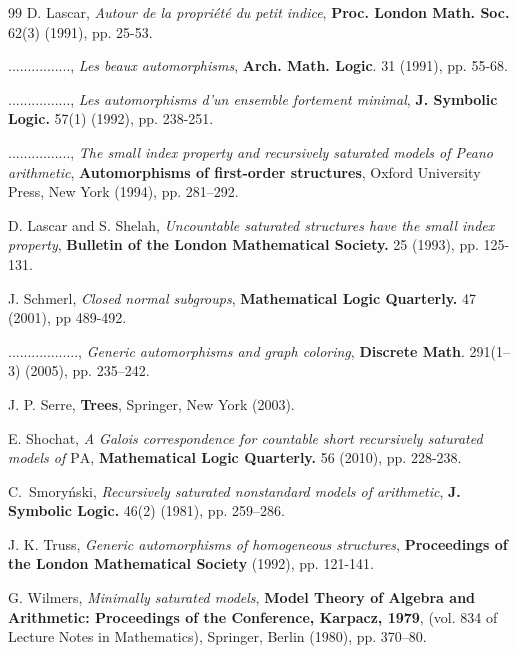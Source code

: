 \documentclass[11pt]{article}
\theoremstyle{plain}
\theoremstyle{definition}
\newcommand{\pa}{\mathrm{PA}}
\begin{document}
\begin{thebibliography}{99}
 D. Lascar, \textit{Autour de la propri\'et\'e du petit indice}, \textbf{Proc. London Math. Soc.} 62(3)  (1991), pp. 25-53.

 ................,  \textit{Les beaux automorphisms}, \textbf{Arch. Math. Logic}. 31 (1991), pp. 55-68.

 ................, \textit{Les automorphisms d'un ensemble fortement minimal}, \textbf{J. Symbolic Logic.} 57(1) (1992), pp. 238-251.

 ................, \textit{The small index property and recursively saturated models of Peano arithmetic}, \textbf{Automorphisms	of first-order structures},  Oxford University Press, New York (1994), pp. 281–292. \cite{km}

 D. Lascar and S.  Shelah,  \textit{Uncountable saturated structures have the small index property}, \textbf{Bulletin of the London Mathematical Society.} 25 (1993), pp. 125-131.

 J. Schmerl, \textit{Closed normal subgroups}, \textbf{Mathematical Logic Quarterly.} 47 (2001), pp 489-492.


  .................., \textit{Generic automorphisms and graph coloring}, \textbf{Discrete Math}. 291(1–3) (2005), pp. 235–242.

 J. P. Serre, \textbf{Trees}, Springer, New York (2003).



  E. Shochat, \textit{A Galois correspondence for countable short recursively saturated models of $\pa$}, \textbf{Mathematical Logic Quarterly.} 56  (2010), pp. 228-238.



  C.~Smory\'{n}ski, \textit{Recursively saturated nonstandard models of arithmetic}, \textbf{J. Symbolic Logic.} 46(2) (1981), pp. 259–286.



 J. K. Truss, \textit{Generic automorphisms of homogeneous structures}, \textbf{ Proceedings of the London Mathematical Society} (1992), pp. 121-141.

 G. Wilmers,\textit{ Minimally saturated models},  \textbf{Model Theory of Algebra and
Arithmetic: Proceedings of the Conference, Karpacz, 1979}, (vol. 834 of Lecture Notes
in Mathematics), Springer, Berlin (1980), pp. 370–80.
\end{thebibliography}
\end{document}
